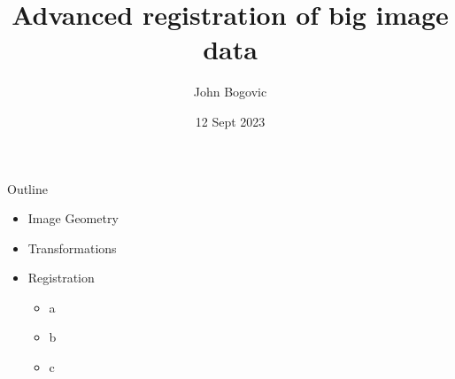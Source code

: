 \documentclass[aspectratio=169]{beamer}
\title[BigWarp]{\LARGE{Advanced registration of big image data} }
\author{John Bogovic}
\date{12 Sept 2023}
\begin{document}

\begin{frame}[plain]
  \titlepage
\end{frame}


\begin{frame}{Outline}
  \begin{itemize}
      \item Image Geometry
      \item Transformations
      \item Registration
      \begin{itemize}
          \item a
          \item b
          \item c
      \end{itemize}
  \end{itemize}

\end{frame}
\end{document}
